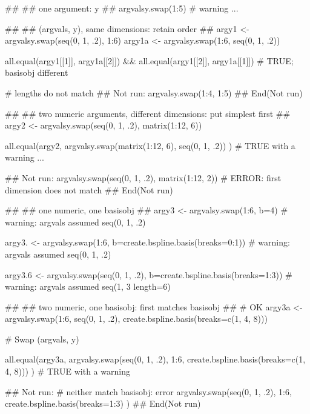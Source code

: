 \begin{Examples}
\begin{ExampleCode}
##
## one argument:  y
##
argvalsy.swap(1:5)
# warning ... 

##
## (argvals, y), same dimensions:  retain order 
##
argy1 <- argvalsy.swap(seq(0, 1, .2), 1:6)
argy1a <- argvalsy.swap(1:6, seq(0, 1, .2))


all.equal(argy1[[1]], argy1a[[2]]) &&
all.equal(argy1[[2]], argy1a[[1]])
# TRUE;  basisobj different 


# lengths do not match 
## Not run: 
argvalsy.swap(1:4, 1:5)
## End(Not run) 

##
## two numeric arguments, different dimensions:  put simplest first 
##
argy2 <- argvalsy.swap(seq(0, 1, .2), matrix(1:12, 6))


all.equal(argy2,
argvalsy.swap(matrix(1:12, 6), seq(0, 1, .2)) )
# TRUE with a warning ... 


## Not run: 
argvalsy.swap(seq(0, 1, .2), matrix(1:12, 2))
# ERROR:  first dimension does not match 
## End(Not run)

##
## one numeric, one basisobj
##
argy3 <- argvalsy.swap(1:6, b=4)
# warning:  argvals assumed seq(0, 1, .2) 

argy3. <- argvalsy.swap(1:6, b=create.bspline.basis(breaks=0:1))
# warning:  argvals assumed seq(0, 1, .2) 

argy3.6 <- argvalsy.swap(seq(0, 1, .2), b=create.bspline.basis(breaks=1:3))
# warning:  argvals assumed seq(1, 3 length=6)

##
## two numeric, one basisobj:  first matches basisobj
##
#  OK 
argy3a <- argvalsy.swap(1:6, seq(0, 1, .2),
              create.bspline.basis(breaks=c(1, 4, 8))) 

#  Swap (argvals, y) 

all.equal(argy3a,
argvalsy.swap(seq(0, 1, .2), 1:6, 
              create.bspline.basis(breaks=c(1, 4, 8))) )
# TRUE with a warning 


## Not run: 
# neither match basisobj:  error  
argvalsy.swap(seq(0, 1, .2), 1:6, 
              create.bspline.basis(breaks=1:3) ) 
## End(Not run)

\end{ExampleCode}
\end{Examples}

